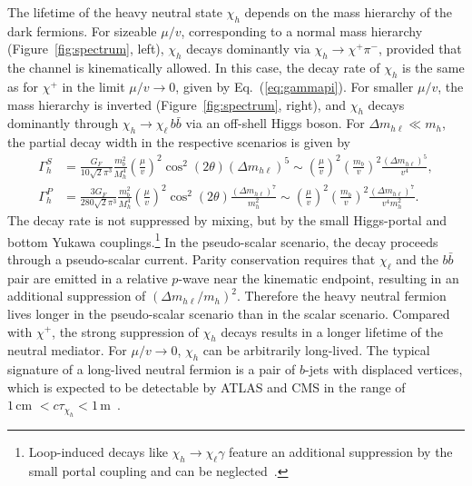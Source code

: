 \documentclass[nofootinbib,prd,aps,superscriptaddress,preprintnumbers]{revtex4}
\begin{document}
The lifetime of the heavy neutral state $\chi_h$ depends on the mass hierarchy of the dark fermions. For sizeable $\mu/v$, corresponding to a normal mass hierarchy (Figure~\ref{fig:spectrum}, left), $\chi_h$ decays dominantly via $\chi_h\to \chi^+\pi^-$, provided that the channel is kinematically allowed. In this case, the decay rate of $\chi_h$ is the same as for $\chi^+$ in the limit $\mu/v\to 0$, given by Eq.~(\ref{eq:gammapi}). For smaller $\mu/v$, the mass hierarchy is inverted (Figure~\ref{fig:spectrum}, right), and $\chi_h$ decays dominantly through $\chi_h \to \chi_\ell\,b\bar{b}$ via an off-shell Higgs boson. For $\Delta m_{h\ell}\ll m_h$, the partial decay width in the respective scenarios is given by
\begin{align}\label{eq:gammah}
\Gamma_h^S & = \frac{G_F}{10\sqrt{2}\pi^3}\frac{m_b^2}{M_h^4} \left(\frac{\mu}{v}\right)^2\cos^2(2\theta)(\Delta m_{h\ell})^5 \sim \left(\frac{\mu}{v}\right)^2 \left(\frac{m_b}{v}\right)^2 \frac{(\Delta m_{h\ell})^5}{v^4},\\\nonumber
\Gamma_h^P & = \frac{3G_F}{280\sqrt{2}\pi^3}\frac{m_b^2}{M_h^4} \left(\frac{\mu}{v}\right)^2\cos^2(2\theta)\frac{(\Delta m_{h\ell})^7}{m_h^2} \sim \left(\frac{\mu}{v}\right)^2 \left(\frac{m_b}{v}\right)^2 \frac{(\Delta m_{h\ell})^7}{v^4m_h^2}.
\end{align}
The decay rate is not suppressed by mixing, but by the small Higgs-portal and bottom Yukawa couplings.\footnote{Loop-induced decays like $\chi_h \to \chi_\ell \gamma$ feature an additional suppression by the small portal coupling and can be neglected~\cite{Nagata:2015pra}.} In the pseudo-scalar scenario, the decay proceeds through a pseudo-scalar current. Parity conservation requires that $\chi_\ell$ and the $b\bar{b}$ pair are emitted in a relative $p$-wave near the kinematic endpoint, resulting in an additional suppression of $(\Delta m_{h\ell}/m_h)^2$. Therefore the heavy neutral fermion lives longer in the pseudo-scalar scenario than in the scalar scenario. Compared with $\chi^+$, the strong suppression of $\chi_h$ decays results in a longer lifetime of the neutral mediator. For $\mu/v\to 0$, $\chi_h$ can be arbitrarily long-lived. The typical signature of a long-lived neutral fermion is a pair of $b$-jets with displaced vertices, which is expected to be detectable by ATLAS and CMS in the range of $1\,\text{cm } < c\tau_{\chi_h} < 1\,\text{m}$~\cite{Nagata:2015pra}.

%
\end{document}
